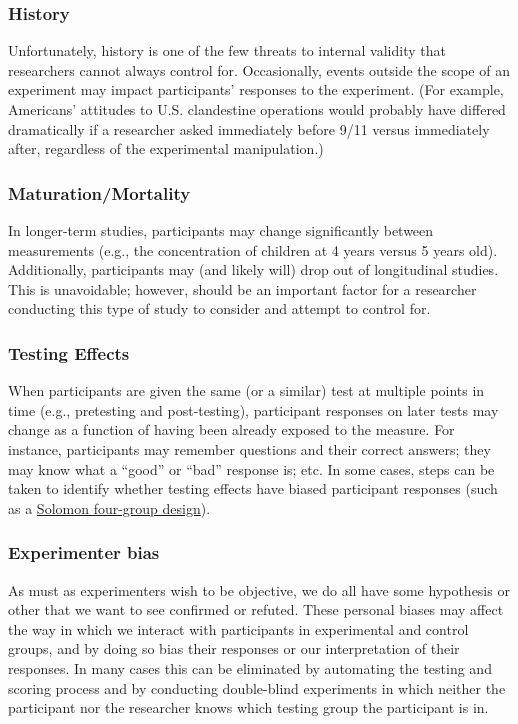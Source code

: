 \subsubsection{History}
Unfortunately, history is one of the few threats to internal validity that researchers cannot always control for. Occasionally, events outside the scope of an experiment may impact participants' responses to the experiment. (For example, Americans' attitudes to U.S. clandestine operations would probably have differed dramatically if a researcher asked immediately before 9/11 versus immediately after, regardless of the experimental manipulation.)

\subsubsection{Maturation/Mortality}
In longer-term studies, participants may change significantly between measurements (e.g., the concentration of children at 4 years versus 5 years old). Additionally, participants may (and likely will) drop out of longitudinal studies. This is unavoidable; however, should be an important factor for a researcher conducting this type of study to consider and attempt to control for.

\subsubsection{Testing Effects}
When participants are given the same (or a similar) test at multiple points in time (e.g., pretesting and post-testing), participant responses on later tests may change as a function of having been already exposed to the measure. For instance, participants may remember questions and their correct answers; they may know what a ``good'' or ``bad'' response is; etc. In some cases, steps can be taken to identify whether testing effects have biased participant responses (such as a \href{http://www.bing.com/search?q=solomon+four-group+design}{Solomon four-group design}).

\subsubsection{Experimenter bias}
As must as experimenters wish to be objective, we do all have some hypothesis or other that we want to see confirmed or refuted. These personal biases may affect the way in which we interact with participants in experimental and control groups, and by doing so bias their responses or our interpretation of their responses. In many cases this can be eliminated by automating the testing and scoring process and by conducting double-blind experiments in which neither the participant nor the researcher knows which testing group the participant is in.

